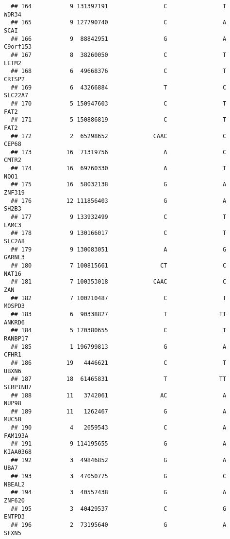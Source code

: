 \documentclass[12pt,twoside]{reedthesis}
\theoremstyle{definition}
\theoremstyle{definition}
\theoremstyle{remark}
\begin{document}
\begin{verbatim}
  ## 164           9 131397191                C                T          WDR34
  ## 165           9 127790740                C                A           SCAI
  ## 166           9  88842951                G                A       C9orf153
  ## 167           8  38260050                C                T          LETM2
  ## 168           6  49668376                C                T         CRISP2
  ## 169           6  43266884                T                C        SLC22A7
  ## 170           5 150947603                C                T           FAT2
  ## 171           5 150886819                C                T           FAT2
  ## 172           2  65298652             CAAC                C          CEP68
  ## 173          16  71319756                A                C          CMTR2
  ## 174          16  69760330                A                T           NQO1
  ## 175          16  58032138                G                A         ZNF319
  ## 176          12 111856403                G                A          SH2B3
  ## 177           9 133932499                C                T          LAMC3
  ## 178           9 130166017                C                T         SLC2A8
  ## 179           9 130083051                A                G         GARNL3
  ## 180           7 100815661               CT                C          NAT16
  ## 181           7 100353018             CAAC                C            ZAN
  ## 182           7 100210487                C                T         MOSPD3
  ## 183           6  90338827                T               TT         ANKRD6
  ## 184           5 170380655                C                T        RANBP17
  ## 185           1 196799813                G                A          CFHR1
  ## 186          19   4446621                C                T          UBXN6
  ## 187          18  61465831                T               TT       SERPINB7
  ## 188          11   3742061               AC                A          NUP98
  ## 189          11   1262467                G                A          MUC5B
  ## 190           4   2659543                C                A        FAM193A
  ## 191           9 114195655                G                A       KIAA0368
  ## 192           3  49846852                G                A           UBA7
  ## 193           3  47050775                G                C         NBEAL2
  ## 194           3  40557438                G                A         ZNF620
  ## 195           3  40429537                C                G         ENTPD3
  ## 196           2  73195640                G                A          SFXN5

\end{verbatim}
\end{document}
